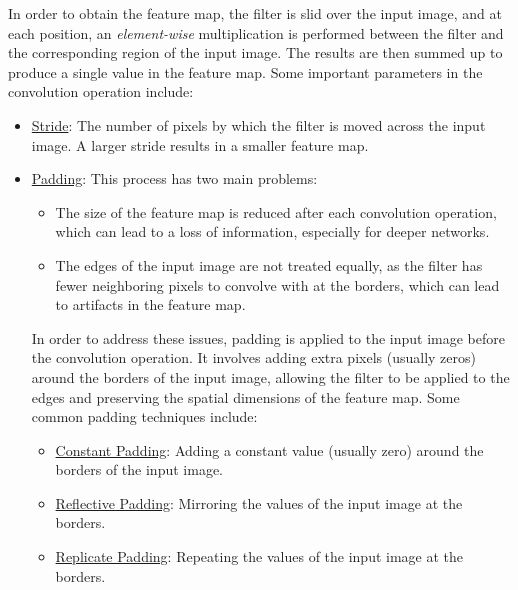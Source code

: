 In order to obtain the feature map, the filter is slid over the input image, and at each position, an \emph{element-wise} multiplication is performed between the filter and the corresponding region of the input image. The results are then summed up to produce a single value in the feature map. Some important parameters in the convolution operation include:
\begin{itemize}
    \item \ul{Stride}: The number of pixels by which the filter is moved across the input image. A larger stride results in a smaller feature map.
    \item \ul{Padding}: This process has two main problems: \begin{itemize}
        \item The size of the feature map is reduced after each convolution operation, which can lead to a loss of information, especially for deeper networks.
        \item The edges of the input image are not treated equally, as the filter has fewer neighboring pixels to convolve with at the borders, which can lead to artifacts in the feature map.
    \end{itemize}

    In order to address these issues, padding is applied to the input image before the convolution operation. It involves adding extra pixels (usually zeros) around the borders of the input image, allowing the filter to be applied to the edges and preserving the spatial dimensions of the feature map. Some common padding techniques include:
    \begin{itemize}
        \item \ul{Constant Padding}: Adding a constant value (usually zero) around the borders of the input image.
        \item \ul{Reflective Padding}: Mirroring the values of the input image at the borders.
        \item \ul{Replicate Padding}: Repeating the values of the input image at the borders.
    \end{itemize}
\end{itemize}

